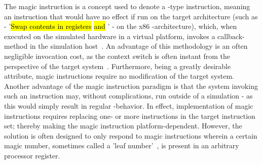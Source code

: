 The magic instruction is a concept used to denote a -type instruction, meaning an instruction that would have no effect if run on the target architecture (such as  - '\hl{Swap contents in registers}  \hl{and} ' - on the x86 -architecture), which, when executed on the simulated hardware in a virtual platform, invokes a callback-method in the simulation host~.
An advantage of this methodology is an often negligible invocation cost, as the context switch is often instant from the perspective of the target system~.
Furthermore, being a greatly desirable attribute, magic instructions require no modification of the target system.
Another advantage of the magic instruction paradigm is that the system invoking such an instruction may, without complications, run outside of a simulation - as this would simply result in regular -behavior.
In effect, implementation of magic instructions requires replacing one- or more instructions in the target instruction set; thereby making the magic instruction platform-dependent.
However, the solution is often designed to only respond to magic instructions wherein a certain magic number, sometimes called a 'leaf number'~, is present in an arbitrary processor register.



